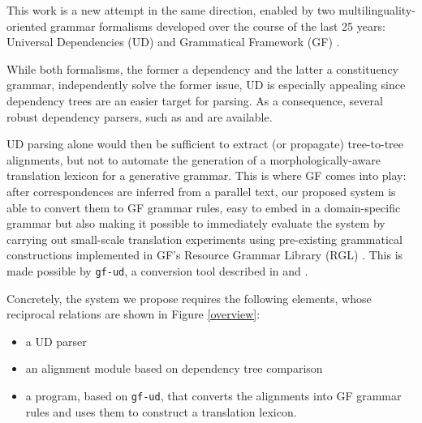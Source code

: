 \documentclass[11pt]{article}
\begin{document}
This work is a new attempt in the same direction, enabled by two multilinguality-oriented grammar formalisms developed over the course of the last 25 years: Universal Dependencies (UD) \cite{TODO:} and Grammatical Framework (GF) \cite{TODO:}.

While both formalisms, the former a dependency and the latter a constituency grammar, independently solve the former issue, UD is especially appealing since dependency trees are an easier target for parsing. 
As a consequence, several robust dependency parsers, such as \cite{TODO: UDPipe} and \cite{TODO: Standford} are available.

UD parsing alone would then be sufficient to extract (or propagate) tree-to-tree alignments, but not to automate the generation of a morphologically-aware translation lexicon for a generative grammar. 
This is where GF comes into play: after correspondences are inferred from a parallel text, our proposed system is able to convert them to GF grammar rules, easy to embed in a domain-specific grammar but also making it possible to immediately evaluate the system by carrying out small-scale translation experiments using pre-existing grammatical constructions implemented in GF's Resource Grammar Library (RGL) \cite{TODO:}.  
This is made possible by \texttt{gf-ud}, a conversion tool described in \cite{TODO:} and \cite{TODO:}.

Concretely, the system we propose requires the following elements, whose reciprocal relations are shown in Figure \ref{overview}: \smallskip

\begin{itemize}
  \item a UD parser
  \item an alignment module based on dependency tree comparison
  \item a program, based on \texttt{gf-ud}, that converts the alignments into GF grammar rules and uses them to construct a translation lexicon.
\end{itemize} \smallskip
\end{document}
